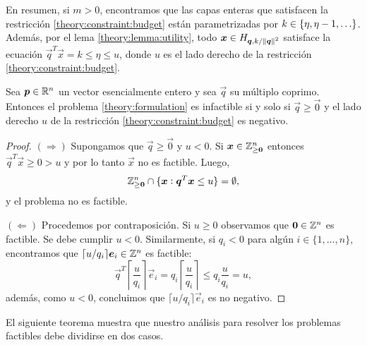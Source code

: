 En resumen, si $m > 0$, encontramos que las capas enteras que satisfacen la restricción
\eqref{theory:constraint:budget} están parametrizadas por $k \in \lbrace \eta, \eta - 1, \ldots \rbrace$.
Además, por el lema \ref{theory:lemma:utility}, todo $\boldsymbol{x} \in H_{\boldsymbol{q}, k/\left\lVert \boldsymbol{q} \right\rVert^{2}}$ satisface la
ecuación $\vec{q}^T\vec{x} = k \leq \eta \leq u$, donde $u$ es el lado derecho de la restricción
\eqref{theory:constraint:budget}.
\begin{theorem}
	\label{theory:th:infeasibility}
	Sea $\boldsymbol{p} \in \mathbb{R}^n$ un vector esencialmente entero y sea $\vec{q}$ su múltiplo coprimo.
	Entonces el problema \eqref{theory:formulation} es infactible si y solo si $\vec{q} \geq
	\vec{0}$ y el lado derecho $u$ de la restricción \eqref{theory:constraint:budget} es negativo. 
\end{theorem}
\begin{proof}
	$(\Rightarrow)$ Supongamos que $\vec{q} \geq \vec{0}$ y $u < 0$. Si $\boldsymbol{x} \in \mathbb{Z}_{\geq
	\boldsymbol{0}}^n$ entonces $\vec{q}^T\vec{x} \geq 0 > u$ y por lo tanto $\vec{x}$ no es factible.
	Luego,
	\begin{equation*}
		\mathbb{Z}_{\geq \boldsymbol{0}}^{n} \cap \lbrace \boldsymbol{x} \vcentcolon \boldsymbol{q}^T\boldsymbol{x} 
		\leq u \rbrace = \emptyset,
	\end{equation*}
	y el problema no es factible.

	$(\Leftarrow)$ Procedemos por contraposición. Si $u
	\geq 0$ observamos que $\boldsymbol{0} \in \mathbb{Z}^n$ es factible. Se debe cumplir $u < 0$. Similarmente, si
	$q_i < 0$ para algún $i \in \lbrace 1, \ldots, n \rbrace$, encontramos que $\lceil u/q_i
	\rceil\boldsymbol{e}_i \in \mathbb{Z}^n$ es factible:
	\begin{equation*}
		\vec{q}^T\left\lceil \frac{u}{q_i} \right\rceil\vec{e}_i
		= q_i \left\lceil \frac{u}{q_i} \right\rceil
		\leq q_i \frac{u}{q_i} = u,
	\end{equation*}
	además, como $u < 0$, concluimos que $\lceil u/q_i \rceil\vec{e}_i$ es no negativo.
\end{proof}

El siguiente teorema muestra que nuestro análisis para resolver los problemas
factibles debe dividirse en dos casos.

